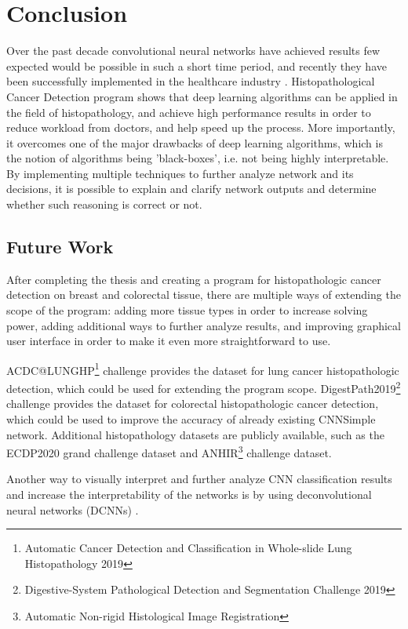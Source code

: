 \chapter{Conclusion}
\label{ch:sum}

Over the past decade convolutional neural networks have achieved results few expected would be possible in such a short time period, and recently they have been successfully implemented in the healthcare industry \cite{miotto2018deep}. Histopathological Cancer Detection program shows that deep learning algorithms can be applied in the field of histopathology, and achieve high performance results in order to reduce workload from doctors, and help speed up the process. More importantly, it overcomes one of the major drawbacks of deep learning algorithms, which is the notion of algorithms being 'black-boxes', i.e. not being highly interpretable. By implementing multiple techniques to further analyze network and its decisions, it is possible to explain and clarify network outputs and determine whether such reasoning is correct or not.

\section{Future Work}

After completing the thesis and creating a program for histopathologic cancer detection on breast and colorectal tissue, there are multiple ways of extending the scope of the program: adding more tissue types in order to increase solving power, adding additional ways to further analyze results, and improving graphical user interface in order to make it even more straightforward to use.

ACDC@LUNGHP\footnote{Automatic Cancer Detection and Classification in Whole-slide Lung Histopathology 2019} challenge provides the dataset for lung cancer histopathologic detection, which could be used for extending the program scope. DigestPath2019\footnote{Digestive-System Pathological Detection and Segmentation Challenge 2019} challenge provides the dataset for colorectal histopathologic cancer detection, which could be used to improve the accuracy of already existing CNNSimple network. Additional histopathology datasets are publicly available, such as the ECDP2020 grand challenge dataset and ANHIR\footnote{ Automatic Non-rigid Histological Image Registration} challenge dataset.

Another way to visually interpret and further analyze CNN classification results and increase the interpretability of the networks is by using deconvolutional neural networks (DCNNs) \cite{zeiler2011adaptive}.